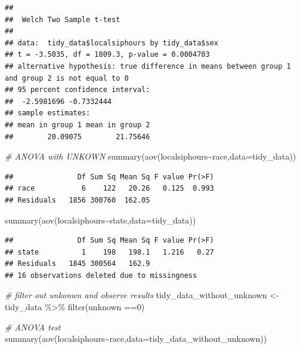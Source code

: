 \documentclass[
  11 pt,
]{article}
\newenvironment{Shaded}{\begin{snugshade}}{\end{snugshade}}
\newcommand{\AttributeTok}[1]{\textcolor[rgb]{0.77,0.63,0.00}{#1}}
\newcommand{\CommentTok}[1]{\textcolor[rgb]{0.56,0.35,0.01}{\textit{#1}}}
\newcommand{\DecValTok}[1]{\textcolor[rgb]{0.00,0.00,0.81}{#1}}
\newcommand{\FunctionTok}[1]{\textcolor[rgb]{0.00,0.00,0.00}{#1}}
\newcommand{\NormalTok}[1]{#1}
\newcommand{\OtherTok}[1]{\textcolor[rgb]{0.56,0.35,0.01}{#1}}
\newcommand{\SpecialCharTok}[1]{\textcolor[rgb]{0.00,0.00,0.00}{#1}}
\begin{document}
\begin{verbatim}
## 
##  Welch Two Sample t-test
## 
## data:  tidy_data$localsiphours by tidy_data$sex
## t = -3.5035, df = 1809.3, p-value = 0.0004703
## alternative hypothesis: true difference in means between group 1 and group 2 is not equal to 0
## 95 percent confidence interval:
##  -2.5981696 -0.7332444
## sample estimates:
## mean in group 1 mean in group 2 
##        20.09075        21.75646
\end{verbatim}

\begin{Shaded}
\begin{Highlighting}[]
\CommentTok{\# ANOVA with UNKOWN}
\FunctionTok{summary}\NormalTok{(}\FunctionTok{aov}\NormalTok{(localsiphours}\SpecialCharTok{\textasciitilde{}}\NormalTok{race,}\AttributeTok{data=}\NormalTok{tidy\_data))}
\end{Highlighting}
\end{Shaded}

\begin{verbatim}
##               Df Sum Sq Mean Sq F value Pr(>F)
## race           6    122   20.26   0.125  0.993
## Residuals   1856 300760  162.05
\end{verbatim}

\begin{Shaded}
\begin{Highlighting}[]
\FunctionTok{summary}\NormalTok{(}\FunctionTok{aov}\NormalTok{(localsiphours}\SpecialCharTok{\textasciitilde{}}\NormalTok{state,}\AttributeTok{data=}\NormalTok{tidy\_data))}
\end{Highlighting}
\end{Shaded}

\begin{verbatim}
##               Df Sum Sq Mean Sq F value Pr(>F)
## state          1    198   198.1   1.216   0.27
## Residuals   1845 300564   162.9               
## 16 observations deleted due to missingness
\end{verbatim}

\begin{Shaded}
\begin{Highlighting}[]
\CommentTok{\# filter out unkonwn and observe results}
\NormalTok{tidy\_data\_without\_unknown }\OtherTok{\textless{}{-}}\NormalTok{ tidy\_data }\SpecialCharTok{\%\textgreater{}\%}
  \FunctionTok{filter}\NormalTok{(unknown }\SpecialCharTok{==}\DecValTok{0}\NormalTok{)}

\CommentTok{\# ANOVA test}
\FunctionTok{summary}\NormalTok{(}\FunctionTok{aov}\NormalTok{(localsiphours}\SpecialCharTok{\textasciitilde{}}\NormalTok{race,}\AttributeTok{data=}\NormalTok{tidy\_data\_without\_unknown))}
\end{Highlighting}
\end{Shaded}
\end{document}
